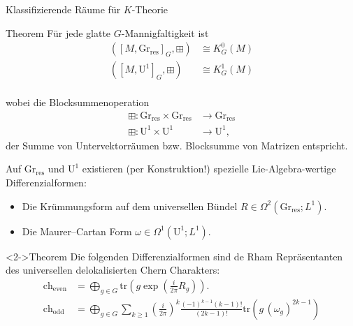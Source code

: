 \documentclass[12pt,utf8,notheorems,compress,t]{beamer}
\renewcommand{\_}{\mathpunct{.}}
\newcommand{\?}{\,{:}\,}
\newcommand{\tr}{\mathrm{tr}}
\newcommand{\ch}{\mathrm{ch}}
\newcommand{\grres}{\mathrm{Gr}_{\mathrm{res}}}
\begin{document}
\begin{frame}{Klassifizierende Räume für $K$-Theorie}
    \begin{block}{Theorem}
        Für jede glatte $G$-Mannigfaltigkeit ist 
        \begin{align*}
            ([M, \mathrm{Gr}_{\mathrm{res}}]_G,\boxplus) &\cong K_G^0(M) \\
            ([M, \mathrm{U}^1]_G,\boxplus) &\cong K_G^1(M) \\
        \end{align*}
    \end{block}
    wobei die Blocksummenoperation
    \begin{align*}
        \boxplus\colon \grres \times \grres &\to \grres \\\boxplus\colon
        \mathrm U^1 \times \mathrm
        U^1 &\to \mathrm U^1,
    \end{align*}
    der Summe von Untervektorräumen bzw. Blocksumme von Matrizen entspricht.
\end{frame}
\begin{frame}
    Auf $\grres$ und $\mathrm U^1$ existieren (per Konstruktion!) spezielle
    Lie-Algebra-wertige Differenzialformen:
    \begin{itemize}
        \item Die Krümmungsform auf dem universellen Bündel $R\in
            \Omega^2(\mathrm{Gr}_{\mathrm{res}}; L^1)$.
        \item Die Maurer--Cartan Form $\omega\in \Omega^1(\mathrm U^1;
            L^1)$.
    \end{itemize}
    \begin{block}<2->{Theorem}
        Die folgenden Differenzialformen sind de Rham Repräsentanten des
        universellen delokalisierten Chern Charakters:
        \begin{align*}
            \ch_{\mathrm{even}} &= \bigoplus_{g\in G} \tr \left( g \exp\left(
            \frac{i}{2\pi}R_g \right) \right). \\
            \ch_{\mathrm{odd}} &= \bigoplus_{g\in G} \sum_{k\geq 1}
            \left(\frac{i}{2\pi}\right)^{k}
            \frac{(-1)^{k-1}(k-1)!}{(2k-1)!}\tr \left(g\,
            (\omega_g)^{2k-1}\right)
        \end{align*}
    \end{block}
\end{frame}
\end{document}
